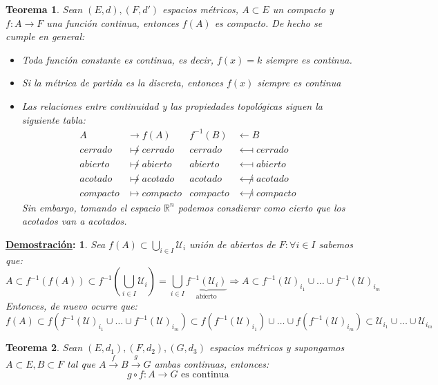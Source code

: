 \documentclass[10pt,a4paper,openright]{book}
\theoremstyle{break}
\newtheorem*{theo}{Teorema}
\newtheorem*{demo}{\underline{Demostración}:}
\begin{document}
\begin{theo}
Sean $(E,d),(F,d')$ espacios métricos, $A \subset E$ un compacto y $f : A \to F$ una función continua, entonces $f(A)$ es compacto. De hecho se cumple en general:
\begin{itemize}
\item Toda función constante es continua, es decir, $f(x)=k$ siempre es continua.
\item Si la métrica de partida es la discreta, entonces $f(x)$ siempre es continua
\item Las relaciones entre continuidad y las propiedades topológicas siguen la siguiente tabla:
\begin{align*}
A &\longrightarrow f(A) & f^{-1}(B) & \longleftarrow B\\
cerrado & \not\longmapsto cerrado  & cerrado & \longmapsfrom cerrado  \\
abierto & \not\longmapsto abierto & abierto & \longmapsfrom abierto \\
acotado & \not\longmapsto acotado & acotado & \not\longmapsfrom acotado \\
compacto & \longmapsto compacto & compacto & \not\longmapsfrom compacto
\end{align*}
Sin embargo, tomando el espacio $\mathbb{R}^n$ podemos consdierar como cierto que los acotados van a acotados.
\end{itemize}
\end{theo}
\begin{demo}
Sea $f(A) \subset \bigcup_{i \in I} \mathcal{U}_i$ unión de abiertos de $F : \forall i \in I$ sabemos que:
$$A \subset f^{-1} (f(A)) \subset f^{-1} \left(\bigcup_{i \in I} \mathcal{U}_i \right) = \bigcup_{i \in I} \underbrace{f^{-1}\left(\mathcal{U}_i\right)}_{\mbox{abierto}} \Rightarrow A \subset f^{-1}(\mathcal{U})_{i_1} \cup \ldots \cup f^{-1}(\mathcal{U})_{i_m}$$
Entonces, de nuevo ocurre que:
$$f(A) \subset f(f^{-1}(\mathcal{U})_{i_1} \cup \ldots \cup f^{-1}(\mathcal{U})_{i_m}) \subset f(f^{-1}(\mathcal{U})_{i_1}) \cup \ldots \cup f(f^{-1}(\mathcal{U})_{i_m}) \subset \mathcal{U}_{i_1} \cup \ldots \cup \mathcal{U}_{i_m}$$
\end{demo}
 
\begin{theo}
Sean $(E, d_1), (F, d_2), (G, d_3)$ espacios métricos y supongamos $A \subset E, B \subset F$ tal que $A \xrightarrow{f} B \xrightarrow{g} G$ ambas continuas, entonces:
$$g \circ f : A \to G \mbox{ es continua }$$
\end{theo}
\end{document}
